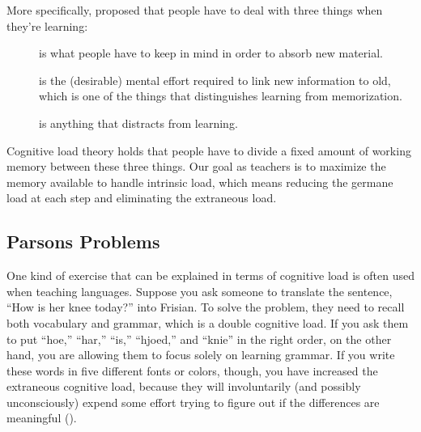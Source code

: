 More specifically,
 proposed that
people have to deal with three things when they're learning:

\begin{description}

\item[]
  is what people have to keep in mind in order to absorb new material.

\item[]
  is the (desirable) mental effort required to link new information to old,
  which is one of the things that distinguishes learning from memorization.

\item[]
  is anything that distracts from learning.

\end{description}

Cognitive load theory holds that
people have to divide a fixed amount of working memory between these three things.
Our goal as teachers is to maximize the memory available to handle intrinsic load,
which means reducing the germane load at each step and eliminating the extraneous load.

\subsection*{Parsons Problems}

One kind of exercise that can be explained in terms of cognitive load
is often used when teaching languages.
Suppose you ask someone to translate the sentence, ``How is her knee today?'' into Frisian.
To solve the problem,
they need to recall both vocabulary and grammar,
which is a double cognitive load.
If you ask them to put ``hoe,'' ``har,'' ``is,'' ``hjoed,'' and ``knie'' in the right order,
on the other hand,
you are allowing them to focus solely on learning grammar.
If you write these words in five different fonts or colors,
though,
you have increased the extraneous cognitive load,
because they will involuntarily (and possibly unconsciously) expend some effort
trying to figure out if the differences are meaningful
().


